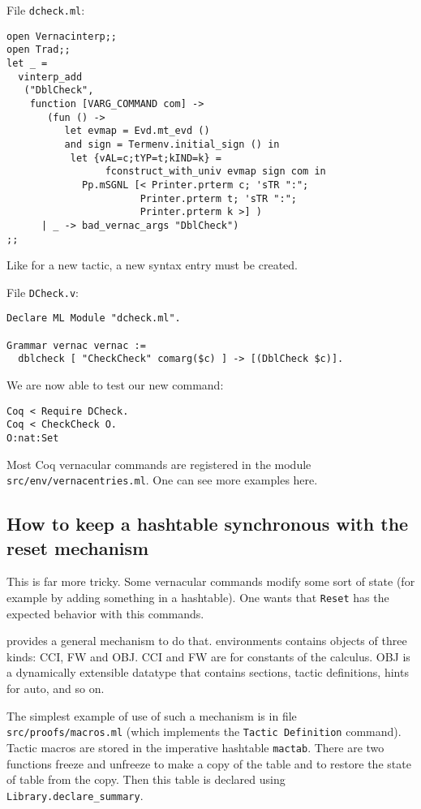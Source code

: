 File \texttt{dcheck.ml}:

\begin{verbatim}
open Vernacinterp;;
open Trad;;
let _ = 
  vinterp_add 
   ("DblCheck",
    function [VARG_COMMAND com] ->
       (fun () -> 
          let evmap = Evd.mt_evd () 
          and sign = Termenv.initial_sign () in
           let {vAL=c;tYP=t;kIND=k} = 
                 fconstruct_with_univ evmap sign com in
             Pp.mSGNL [< Printer.prterm c; 'sTR ":"; 
                       Printer.prterm t; 'sTR ":"; 
                       Printer.prterm k >] )
      | _ -> bad_vernac_args "DblCheck")
;;
\end{verbatim}

Like for a new tactic, a new syntax entry must be created.

File \texttt{DCheck.v}:

\begin{verbatim}
Declare ML Module "dcheck.ml".

Grammar vernac vernac := 
  dblcheck [ "CheckCheck" comarg($c) ] -> [(DblCheck $c)].
\end{verbatim}

We are now able to test our new command:

\begin{verbatim}
Coq < Require DCheck.
Coq < CheckCheck O.
O:nat:Set
\end{verbatim}

Most Coq vernacular commands are registered in the module 
  \verb+src/env/vernacentries.ml+. One can see more examples here.

\subsection{How to keep a hashtable synchronous with the reset mechanism}

This is far more tricky. Some vernacular commands modify some
sort of state (for example by adding something in a hashtable). One
wants that \texttt{Reset} has the expected behavior with this
commands.

\Coq{} provides a general mechanism to do that. \Coq{} environments
contains objects of three kinds: CCI, FW and OBJ. CCI and FW are for
constants of the calculus. OBJ is a dynamically extensible datatype
that contains sections, tactic definitions, hints for auto, and so
on. 

The simplest example of use of such a mechanism is in file
\verb+src/proofs/macros.ml+ (which implements the \texttt{Tactic
  Definition} command). Tactic macros are stored in the imperative
hashtable \texttt{mactab}. There are two functions freeze and unfreeze
to make a copy of the table and to restore the state of table from the
copy. Then this table is declared using \texttt{Library.declare\_summary}.


